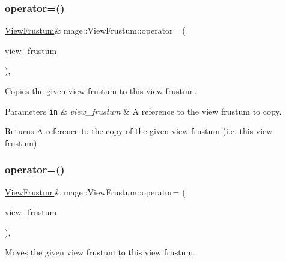 \subsubsection{\texorpdfstring{operator=()}{operator=()}\hspace{0.1cm}{\footnotesize\ttfamily [1/2]}}
{\footnotesize\ttfamily \hyperlink{structmage_1_1_view_frustum}{View\+Frustum}\& mage\+::\+View\+Frustum\+::operator= (\begin{DoxyParamCaption}\item[{const \hyperlink{structmage_1_1_view_frustum}{View\+Frustum} \&}]{view\+\_\+frustum }\end{DoxyParamCaption})\hspace{0.3cm}{\ttfamily [default]}, {\ttfamily [noexcept]}}

Copies the given view frustum to this view frustum.


\begin{DoxyParams}[1]{Parameters}
\mbox{\tt in}  & {\em view\+\_\+frustum} & A reference to the view frustum to copy. \\
\hline
\end{DoxyParams}
\begin{DoxyReturn}{Returns}
A reference to the copy of the given view frustum (i.\+e. this view frustum). 
\end{DoxyReturn}
\hypertarget{structmage_1_1_view_frustum_a117dd9f3b6c3c80607aa34ee012a7a3a}{}\label{structmage_1_1_view_frustum_a117dd9f3b6c3c80607aa34ee012a7a3a} 
\subsubsection{\texorpdfstring{operator=()}{operator=()}\hspace{0.1cm}{\footnotesize\ttfamily [2/2]}}
{\footnotesize\ttfamily \hyperlink{structmage_1_1_view_frustum}{View\+Frustum}\& mage\+::\+View\+Frustum\+::operator= (\begin{DoxyParamCaption}\item[{\hyperlink{structmage_1_1_view_frustum}{View\+Frustum} \&\&}]{view\+\_\+frustum }\end{DoxyParamCaption})\hspace{0.3cm}{\ttfamily [default]}, {\ttfamily [noexcept]}}

Moves the given view frustum to this view frustum.


